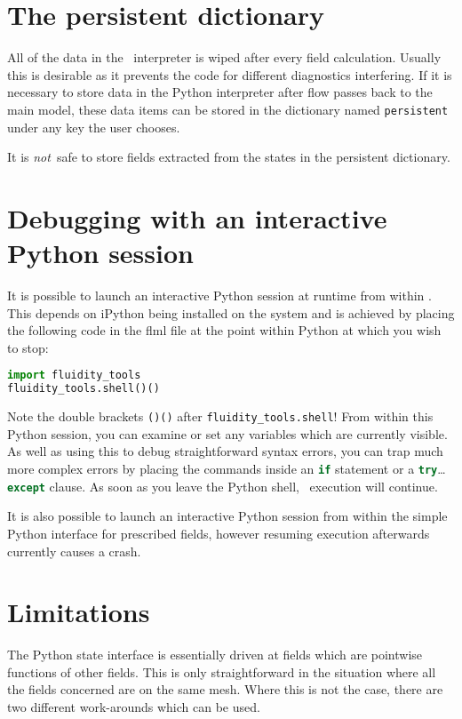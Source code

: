 \section{The persistent dictionary}

All of the data in the \fluidity\ interpreter is wiped after every field
calculation. Usually this is desirable as it prevents the code for different
diagnostics interfering. If it is necessary to store data in the Python
interpreter after flow passes back to the main model, these data items can
be stored in the dictionary named \lstinline[language=Python]+persistent+
under any key the user chooses.

It is \emph{not}\ safe to store fields extracted from the states in the
persistent dictionary. 

\section{Debugging with an interactive Python session}

It is possible to launch an interactive Python session at runtime from
within \fluidity. This depends on iPython being installed on the system and
is achieved by placing the following code in the flml file at the point
within Python at which you wish to stop:
\begin{lstlisting}[language=Python]
import fluidity_tools
fluidity_tools.shell()()
\end{lstlisting}
Note the double brackets \lstinline[language=Python]+()()+ after
\lstinline[language=Python]+fluidity_tools.shell+! From within this Python
session, you can examine or set any variables which are currently
visible. As well as using this to debug straightforward syntax errors, you
can trap much more complex errors by placing the commands inside an
\lstinline[language=Python]+if+ statement or a
\lstinline[language=Python]+try+\ldots\lstinline[language=Python]+except+ clause.
As soon as you leave the Python shell, \fluidity\ execution will continue.

It is also possible to launch an interactive Python session from within the
simple Python interface for prescribed fields, however resuming execution
afterwards currently causes a crash.

\section{Limitations}

The Python state interface is essentially driven at fields which are
pointwise functions of other fields. This is only straightforward in the
situation where all the fields concerned are on the same mesh. Where this is
not the case, there are two different work-arounds which can be used.

